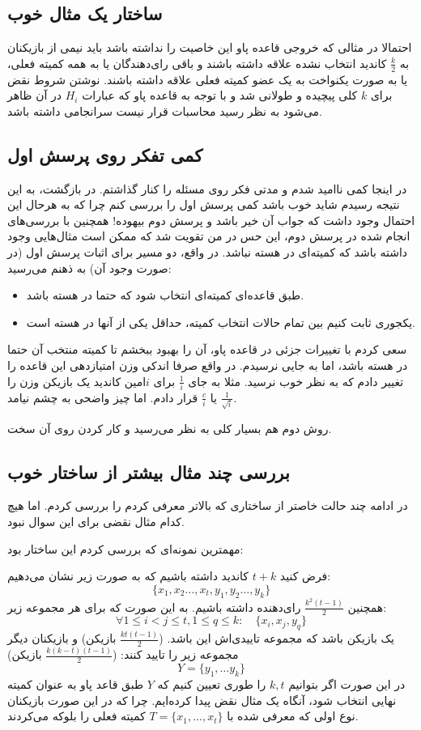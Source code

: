 \documentclass[12pt]{article}
\begin{document}
\subsection{ساختار یک مثال خوب}
احتمالا در مثالی که خروجی قاعده پاو این خاصیت را نداشته باشد
باید 
نیمی از بازیکنان به
$\frac{k}{2}$
کاندید انتخاب نشده 
علاقه داشته باشند و باقی رای‌دهندگان 
یا به همه کمیته فعلی، یا به صورت یکنواخت به یک عضو کمیته فعلی علاقه داشته
باشند.
نوشتن شروط نقض برای $k$ 
کلی پیچیده و طولانی شد و با توجه به قاعده پاو که عبارات
$H_i$
در آن ظاهر می‌شود به نظر رسید محاسبات قرار نیست سرانجامی داشته باشد.

\subsection{کمی تفکر روی پرسش اول}
در اینجا کمی ناامید شدم و مدتی فکر روی مسئله را کنار گذاشتم.
در بازگشت، به این نتیجه رسیدم شاید خوب باشد کمی پرسش اول را بررسی کنم
چرا که به هرحال این احتمال وجود داشت که جواب آن خیر باشد و پرسش دوم بیهوده!
همچنین با بررسی‌های انجام شده در پرسش دوم، این حس در من تقویت شد که ممکن است مثال‌هایی
وجود داشته باشد که کمیته‌ای در هسته نباشد. در واقع، دو مسیر برای اثبات پرسش اول
(در صورت وجود آن)
به ذهنم می‌رسید:
\begin{itemize}
    \item  طبق قاعده‌ای کمیته‌ای انتخاب شود که حتما در هسته باشد.
    \item یکجوری ثابت کنیم بین تمام حالات انتخاب کمیته، حداقل یکی از آنها در هسته است.
\end{itemize}

سعی کردم با تغییرات جزئی در قاعده پاو، آن را بهبود ببخشم تا کمیته منتخب
آن حتما در هسته باشد، اما به جایی نرسیدم. در واقع صرفا اندکی وزن امتیازدهی این 
قاعده را تغییر دادم که به نظر خوب نرسید. مثلا به جای 
$\frac{1}{i}$
برای $i$امین کاندید یک بازیکن
وزن را
$\frac{1}{\sqrt{i} }$
یا
$\frac{c}{i}$
قرار دادم. اما چیز واضحی به چشم نیامد.

روش دوم هم بسیار کلی به نظر می‌رسید و کار کردن روی آن سخت. 

\subsection{ بررسی چند مثال بیشتر از ساختار خوب}
در ادامه چند حالت خاصتر از ساختاری که بالاتر معرفی کردم را بررسی کردم. 
اما هیچ کدام مثال نقضی برای این سوال نبود.

مهمترین نمونه‌ای که بررسی کردم این ساختار بود:

فرض کنید
$t+k$ 
کاندید داشته باشیم که به صورت زیر نشان می‌دهیم:
\[
\{x_1, x_2 \dots ,x_t, y_1, y_2 \dots , y_k\}
\]
همچنین $\frac{k^2 (t-1)}{2}$
رای‌دهنده داشته باشیم. به این صورت که برای هر مجموعه زیر:
\[
\forall 1 \le i < j \le t , 1 \le q \le k : \quad \{x_i, x_j, y_q\}
\]
یک بازیکن باشد که مجموعه تاییدی‌اش این باشد.
($\frac{kt(t-1)}{2}$ بازیکن)
و بازیکنان دیگر مجموعه زیر را تایید کنند:
($\frac{k(k-t)(t-1)}{2}$ بازیکن)
\[
Y =
\{y_1, \dots y_k\}
\]
در این صورت اگر بتوانیم $k, t$
را طوری تعیین کنیم که $Y$
طبق قاعد پاو به عنوان کمیته نهایی انتخاب شود، آنگاه یک مثال نقض پیدا کرده‌ایم.
چرا که در این صورت بازیکنان نوع اولی که معرفی شده با 
$T = \{x_1, \dots , x_t\}$
کمیته فعلی را بلوکه می‌کردند. 
\end{document}
